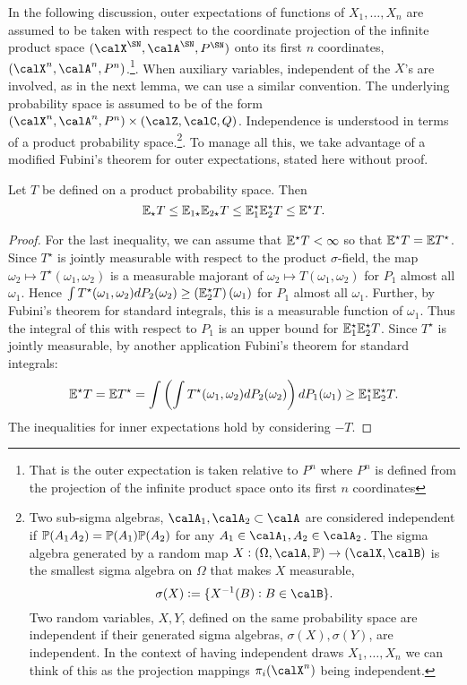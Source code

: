 In the following discussion, outer expectations of functions of \(X_1,\dots,X_n\) are assumed to be taken with respect to the coordinate projection of the infinite product space \((\calX^\SN,\calA^\SN,P^\SN)\) onto its first \(n\) coordinates,  \((\calX^n,\calA^n, P^n)\).\footnote{That is the outer expectation is taken relative to \(P^n\)  where  \(P^n\) is defined from the projection of the infinite product space onto its first  \(n\) coordinates}. When auxiliary variables, independent of the \(X\)'s are involved, as in the next lemma, we can use a similar convention. The underlying probability space is assumed to be of the form \((\calX^n,\calA^n,P^n)\times(\calZ,\calC,Q)\). Independence is understood in terms of a product probability space.\footnote{Two sub-sigma algebras, \(\calA_1, \calA_2 \subset\calA\) are considered independent if \(\P(A_1A_2) = \P(A_1)\P(A_2)\) for any  \(A_1 \in \calA_1,A_2\in\calA_2\). The sigma algebra generated by a
random map \(X:\left(\Omega,\calA,\P\right)\to(\calX,\calB)\) is the smallest sigma algebra on \(\Omega\) that makes  \(X\) measurable, 
\[
	\sigma(X) := \{X^{-1}(B):B\in\calB\} 
.\] 
Two random variables, \(X,Y\), defined on the same probability space are independent if their generated sigma algebras, \(\sigma(X),\sigma(Y)\), are independent. In the context of having independent draws \(X_1,\dots,X_n\) we can think of this as the projection mappings \(\pi_i(\calX^n)\) being independent. 
}. To manage all this, we take advantage of a modified Fubini's theorem for outer expectations, stated here without proof. 
\begin{lemma}
	\label{lemma:vdv1.2.6}
	Let \(T\) be defined on a product probability space. Then
	 \[
		 \E_\star T\leq \E_{1\star}\E_{2\star}T\leq \E_1^\star\E_2^\star T \leq \E^\star T
	.\] 
\end{lemma}
\begin{proof}
	For the last inequality, we can assume that \(\E^\star T < \infty\) so that  \(\E^\star T = \E T^\star\). Since \(T^\star\) is jointly measurable with respect to the product  \(\sigma\)-field, the map  \(\omega_2\mapsto T^\star(\omega_1,\omega_2)\) is a measurable majorant of  \(\omega_2\mapsto T(\omega_1,\omega_2)\) for \(P_1\) almost all  \(\omega_1\). Hence \(\int T^\star(\omega_1,\omega_2)dP_2(\omega_2)\geq \left(\E_2^\star T\right)(\omega_1)\) for \(P_1\) almost all  \(\omega_1\). Further, by Fubini's theorem for standard integrals, this is a measurable function of \(\omega_1\). Thus the integral of this with respect to \(P_1\) is an upper bound for \(\E_1^\star\E_2^\star T\). Since  \(T^\star\) is jointly measurable, by another application Fubini's theorem for standard integrals:
	 \[
		 \E^\star T = \E T^\star = \int\left(\int T^\star(\omega_1,\omega_2)dP_2(\omega_2)\right)dP_1(\omega_1)\geq \E_1^\star\E_2^\star T 
	.\]
	The inequalities for inner expectations hold by considering \(-T\).
\end{proof}


